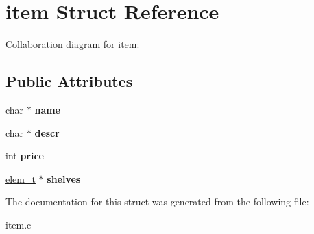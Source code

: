 \hypertarget{structitem}{}\section{item Struct Reference}
\label{structitem}


Collaboration diagram for item\+:
\subsection*{Public Attributes}
\begin{DoxyCompactItemize}
\item 
char $\ast$ {\bfseries name}\hypertarget{structitem_adbf6cb817816601a08c614bb77bcf075}{}\label{structitem_adbf6cb817816601a08c614bb77bcf075}

\item 
char $\ast$ {\bfseries descr}\hypertarget{structitem_a7486c43d6e783fd7093dc9cee62b518f}{}\label{structitem_a7486c43d6e783fd7093dc9cee62b518f}

\item 
int {\bfseries price}\hypertarget{structitem_a77214da8535815143a7ba318a25c5811}{}\label{structitem_a77214da8535815143a7ba318a25c5811}

\item 
\hyperlink{unionelement}{elem\+\_\+t} $\ast$ {\bfseries shelves}\hypertarget{structitem_a9a37097a16c58148fa9a82a1573c831b}{}\label{structitem_a9a37097a16c58148fa9a82a1573c831b}

\end{DoxyCompactItemize}


The documentation for this struct was generated from the following file\+:\begin{DoxyCompactItemize}
\item 
item.\+c\end{DoxyCompactItemize}
